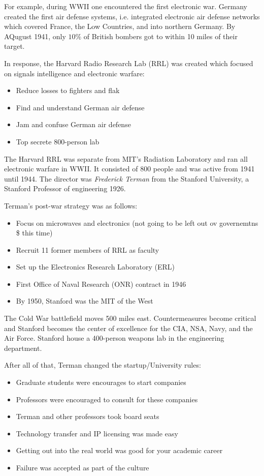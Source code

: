 \documentclass[a4paper]{extarticle}
\begin{document}
For example, during WWII one encountered the first electronic war. Germany created the first air defense systems, i.e. integrated electronic air defense networks which covered France, the Low Countries, and into northern Germany. By AQugust 1941, only $10\%$ of British bombers got to within 10 miles of their target.

In response, the Harvard Radio Research Lab (RRL) was created which focused on signals intelligence and electronic warfare:

\begin{itemize}
    \item Reduce losses to fighters and flak
    \item Find and understand German air defense
    \item Jam and confuse German air defense
    \item Top secrete 800-person lab
\end{itemize}

The Harvard RRL was separate from MIT's Radiation Laboratory and ran all electronic warfare in WWII. It consisted of 800 people and was active from 1941 until 1944. The director was \textit{Frederick Terman} from the Stanford University, a Stanford Professor of engineering 1926.

Terman's post-war strategy was as follows:

\begin{itemize}
    \item Focus on microwaves and electronics (not going to be left out ov governemtns \$ this time)
    \item Recruit 11 former members of RRL as faculty
    \item Set up the Electronics Research Laboratory (ERL)
    \item First Office of Naval Research (ONR) contract in 1946
    \item By 1950, Stanford was the MIT of the West
\end{itemize}

The Cold War battlefield moves 500 miles east. Countermeasures become critical and Stanford becomes the center of excellence for the CIA, NSA, Navy, and the Air Force. Stanford house a 400-person weapons lab in the engineering department.

After all of that, Terman changed the startup/University rules:

\begin{itemize}
    \item Graduate students were encourages to start companies
    \item Professors were encouraged to consult for these companies
    \item Terman and other professors took board seats
    \item Technology transfer and IP licensing was made easy
    \item Getting out into the real world was good for your academic career
    \item Failure was accepted as part of the culture
\end{itemize}
\end{document}
